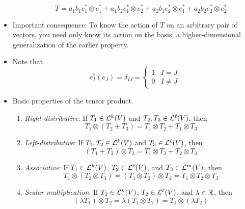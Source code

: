 \documentclass[../notes.tex]{subfiles}
\begin{document}
\begin{itemize}
\begin{itemize}
        \begin{equation*}
            T = a_1b_1e_1^*\otimes e_1^*+a_1b_2e_1^*\otimes e_2^*+a_2b_1e_2^*\otimes e_1^*+a_2b_2e_2^*\otimes e_2^*
        \end{equation*}
    \end{itemize}
    \item Important consequence: To know the action of $T$ on an arbitrary pair of vectors, you need only know its action on the basis; a higher-dimensional generalization of the earlier property.
    \item Note that
    \begin{equation*}
        e_I^*(e_J) = \delta_{IJ} =
        \begin{cases}
            1 & I=J\\
            0 & I\neq J
        \end{cases}
    \end{equation*}
    \item Basic properties of the tensor product.
    \begin{enumerate}
        \item \emph{Right-distributive}: If $T_1\in\lin[k]{V}$ and $T_2,T_3\in\lin[\ell]{V}$, then
        \begin{equation*}
            T_1\otimes(T_2+T_3) = T_1\otimes T_2+T_1\otimes T_3
        \end{equation*}
        \item \emph{Left-distributive}: If $T_1,T_2\in\lin[k]{V}$ and $T_3\in\lin[\ell]{V}$, then
        \begin{equation*}
            (T_1+T_2)\otimes T_3 = T_1\otimes T_3+T_2\otimes T_3
        \end{equation*}
        \item \emph{Associative}: If $T_1\in\lin[k]{V}$, $T_2\in\lin[\ell]{V}$, and $T_3\in\lin[m]{V}$, then
        \begin{equation*}
            T_1\otimes(T_2\otimes T_3) = (T_1\otimes T_2)\otimes T_2
            = T_1\otimes T_2\otimes T_3
        \end{equation*}
        \item \emph{Scalar multiplication}: If $T_1\in\lin[k]{V}$, $T_2\in\lin[\ell]{V}$, and $\lambda\in\R$, then
        \begin{equation*}
            (\lambda T_1)\otimes T_2 = \lambda(T_1\otimes T_2)
            = T_1\otimes(\lambda T_2)
        \end{equation*}
    \end{enumerate}

\end{itemize}
\end{document}
